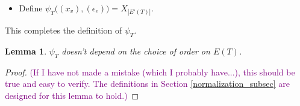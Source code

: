 \documentclass[11pt]{article}
\newtheorem{lmm}[thm]{Lemma}
\theoremstyle{definition}
\theoremstyle{remark}
\def\R{\mathbb{R}}
\def\cmt#1{\textcolor{purple}{(#1)}}
\def\tn#1{\textnormal{#1}}
\begin{document}
\begin{itemize}
\begin{itemize}
\begin{itemize}
$$\begin{cases}
v_-(e)=v_+(e')\implies \epsilon_{\tn{contr}^E_{T_i;e'}(e)}=\epsilon_e\cdot\epsilon_{e'},\\
v_-(e)=v_-(e')\implies \epsilon_{\tn{contr}^E_{T_i;e'}(e)}=\epsilon_e,\\ 
v_+(e)=v_-(e')\implies \epsilon_{\tn{contr}^E_{T_i;e'}(e)}=\epsilon_e.
\end{cases}$$
\item If $ls(v_-(e'))=ls(v_+(e'))=\R^d$ and $v_+(e)$ is the out-most marked point in $x_{i,v_-(e)}$, then...
\cmt{not yet written; would be very annoying to write; you can probably see what I want to say; should find another way to write these, or change the second bullet in Definition  \ref{screennormalize_dfn}}
\item If $ls(v_-(e'))=\pi_i$, $ls(v_+(e'))=\pi_{3-i}$: let $\star_e\in E_i$ be the position of the marked point $v_+(e')$ in the configuration $x_{i,v_-(e)}$.  
\begin{itemize}
\item If $\star_e\in E_i(2)$, then, for all $e\neq e'\in E(T_i)$, $\epsilon_{\tn{contr}^E_{T_i;e'}(e)}=\epsilon_e$.
\item If $\star_e\in E_i-\sigma_i(E_i)-E_i(2)$: let $g_i:E_i-\sigma_i(B_i)\to \R^{\ge1}$ be the function defined in Section \ref{trivEI1_subsubsec}. 
Then, 
$$\begin{cases}
v_-(e)=v_+(e')\implies \epsilon_{\tn{contr}^E_{T_i;e'}(e)}=\epsilon_e,\\
v_-(e)=v_-(e')\implies \epsilon_{\tn{contr}^E_{T_i;e'}(e)}=\epsilon_e\cdot g_i(\star_e)/3,\\ 
v_+(e)=v_-(e')\implies \epsilon_{\tn{contr}^E_{T_i;e'}(e)}=\epsilon_e\cdot3/g_i(\star_e).
\end{cases}$$
\end{itemize}
\end{itemize}
\end{itemize}
\item Define $\psi_T\big((x_v),(\epsilon_e)\big)=X_{|E'(T)|}$. 
\end{itemize}
This completes the definition of $\psi_T$. 

\begin{lmm}\label{psicommute_lmm}
$\psi_T$ doesn't depend on the choice of order on $E(T)$. 
\end{lmm}
\begin{proof}
\cmt{If I have not made a mistake (which I probably have...), this should be true and easy to verify. The definitions in Section \ref{normalization_subsec} are designed for this lemma to hold.}
\end{proof}
\end{document}
